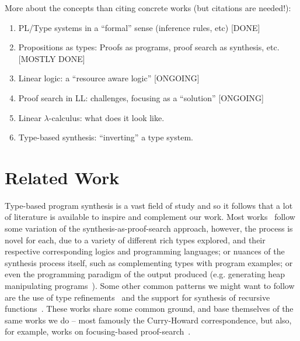 \documentclass{llncs}
\begin{document}
More about the concepts than citing concrete works (but citations are
needed!):
\begin{enumerate}
\item PL/Type systems in a ``formal'' sense (inference rules, etc) [DONE]
\item Propositions as types: Proofs as programs, proof search as
  synthesis, etc. [MOSTLY DONE]
\item Linear logic: a ``resource aware logic'' [ONGOING]
\item Proof search in LL: challenges, focusing as a ``solution'' [ONGOING]
\item Linear $\lambda$-calculus: what does it look like.
\item Type-based synthesis: ``inverting'' a type system.
\end{enumerate}

\section{Related Work}



Type-based program synthesis is a vast field of study and so it
follows that a lot of literature is available to inspire and
complement our work. Most works~\cite{} follow some variation of the
synthesis-as-proof-search approach, however, the process is novel for
each, due to a variety of different rich types explored, and their
respective corresponding logics and programming languages; or nuances
of the synthesis process itself, such as complementing types with
program examples; or even the programming paradigm of the output
produced (e.g. generating heap manipulating
programs~\cite{DBLP:journals/pacmpl/PolikarpovaS19}).  Some other
common patterns we might want to follow are the use of type
refinements~\cite{} and the support for synthesis of recursive
functions~\cite{}.  These works share some common ground, and base
themselves of the same works we do -- most famously the Curry-Howard
correspondence, but also, for example, works on focusing-based
proof-search~\cite{focusing}.
\end{document}
